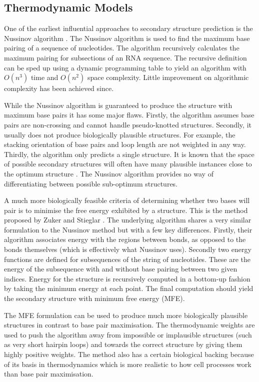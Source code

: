 \documentclass[journal]{IEEEtran}
\begin{document}
\subsection{Thermodynamic Models}
\label{subsec:thermodynamic-models}

One of the earliest influential approaches to secondary structure prediction is the Nussinov algorithm \cite{nussinov1980fast}. The Nussinov algorithm is used to find the maximum base pairing of a sequence of nucleotides. The algorithm recursively calculates the maximum pairing for subsections of an RNA sequence. The recursive definition can be sped up using a dynamic programming table to yield an algorithm with $O(n^3)$ time and $O(n^2)$ space complexity. Little improvement on algorithmic complexity has been achieved since. 

While the Nussinov algorithm is guaranteed to produce the structure with maximum base pairs it has some major flaws. Firstly, the algorithm assumes base pairs are non-crossing and cannot handle pseudo-knotted structures. Secondly, it usually does not produce biologically plausible structures. For example, the stacking orientation of base pairs and loop length are not weighted in any way. Thirdly, the algorithm only predicts a single structure. It is known that the space of possible secondary structures will often have many plausible instances close to the optimum structure \cite{mccaskill1990equilibrium}. The Nussinov algorithm provides no way of differentiating between possible sub-optimum structures. 

A much more biologically feasible criteria of determining whether two bases will pair is to minimise the free energy exhibited by a structure. This is the method proposed by Zuker and Stieglar \cite{zuker1981optimal}. The underlying algorithm shares a very similar formulation to the Nussinov method but with a few key differences. Firstly, their algorithm associates energy with the regions between bonds, as opposed to the bonds themselves (which is effectively what Nussinov uses). Secondly two energy functions are defined for subsequences of the string of nucleotides. These are the energy of the subsequence with and without base pairing between two given indices. Energy for the structure is recursively computed in a bottom-up fashion by taking the minimum energy at each point. The final computation should yield the secondary structure with minimum free energy (MFE).

The MFE formulation can be used to produce much more biologically plausible structures in contrast to base pair maximisation. The thermodynamic weights are used to push the algorithm away from impossible or implausible structures (such as very short hairpin loops) and towards the correct structure by giving them highly positive weights. The method also has a certain biological backing because of its basis in thermodynamics which is more realistic to how cell processes work than base pair maximisation. 
\end{document}
